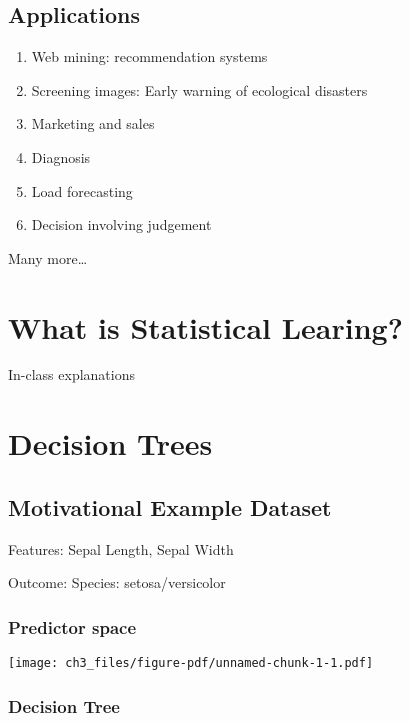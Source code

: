 \documentclass[
  letterpaper,
  DIV=11,
  numbers=noendperiod]{scrreprt}
\begin{document}
\section{Applications}\label{applications}

\begin{enumerate}
\def\labelenumi{\arabic{enumi}.}
\item
  Web mining: recommendation systems
\item
  Screening images: Early warning of ecological disasters
\item
  Marketing and sales
\item
  Diagnosis
\item
  Load forecasting
\item
  Decision involving judgement
\end{enumerate}

Many more\ldots{}


\chapter{What is Statistical
Learing?}\label{what-is-statistical-learing}

In-class explanations


\chapter{Decision Trees}\label{decision-trees}

\section{Motivational Example
Dataset}\label{motivational-example-dataset}

Features: Sepal Length, Sepal Width

Outcome: Species: setosa/versicolor

\subsection{Predictor space}\label{predictor-space}

\texttt{[image: ch3\_files/figure-pdf/unnamed-chunk-1-1.pdf]}

\subsection{Decision Tree}\label{decision-tree}
\end{document}
